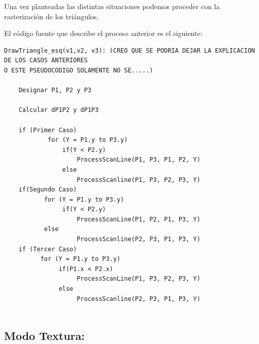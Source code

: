 \documentclass[a4paper]{article}
\begin{document}
Una vez planteadas las distintas situaciones podemos proceder con la rasterización de los triángulos. 
  
El código fuente que describe el proceso anterior es el siguiente:

\begin{verbatim}
DrawTriangle_esq(v1,v2, v3): (CREO QUE SE PODRIA DEJAR LA EXPLICACION DE LOS CASOS ANTERIORES 
O ESTE PSEUDOCODIGO SOLAMENTE NO SE.....)

    Designar P1, P2 y P3 
    
    Calcular dP1P2 y dP1P3
    
    if (Primer Caso)
            for (Y = P1.y to P3.y)    	
                if(Y < P2.y)
                    ProcessScanLine(P1, P3, P1, P2, Y)
                else
                    ProcessScanline(P1, P3, P2, P3, Y)
    if(Segundo Caso)
           for (Y = P1.y to P3.y)    	
                if(Y < P2.y)
                    ProcessScanLine(P1, P2, P1, P3, Y)
           else
                    ProcessScanline(P2, P3, P1, P3, Y)
    if (Tercer Caso)	
          for (Y = P1.y to P3.y)    	
               if(P1.x < P2.x)
                    ProcessScanLine(P1, P3, P2, P3, Y)
               else
                    ProcessScanline(P2, P3, P1, P3, Y)
  					
\end{verbatim}


\subsection{Modo Textura:} 
\end{document}

